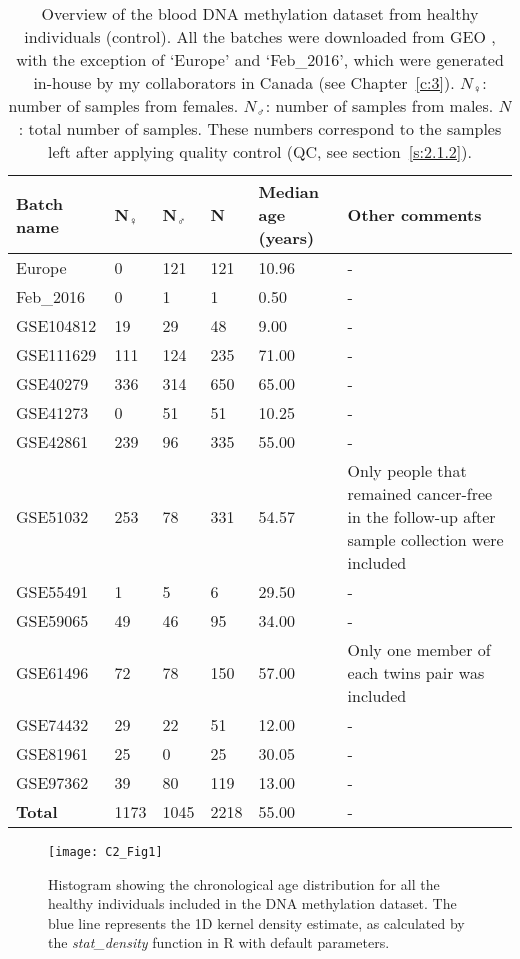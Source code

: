 \begin{table}
\small
	\begin{tabular}{ p{2cm} p{1cm} p{1cm} p{1cm} p{2cm} p{6cm} }
		\toprule
		\textbf{Batch name} & \textbf{N$_{\female}$} & \textbf{N$_{\male}$} & \textbf{N} & \textbf{Median age (years)} & \textbf{Other comments} \\
		\midrule
		Europe & 0 & 121 & 121 & 10.96 & - \\
		Feb\_2016 & 0 & 1 & 1 & 0.50 & - \\
		GSE104812 & 19 & 29 & 48 & 9.00 & - \\
		GSE111629 & 111 & 124 & 235 &  71.00 & - \\
		GSE40279 & 336 & 314 & 650 & 65.00 & - \\
		GSE41273 & 0 & 51 & 51 & 10.25 & - \\
		GSE42861 & 239 & 96 & 335 & 55.00 & - \\
		GSE51032 & 253 & 78 & 331 & 54.57 & Only people that remained cancer-free in the follow-up after sample collection were included  \\
		GSE55491 & 1 & 5 & 6 & 29.50 & - \\
		GSE59065 & 49 & 46 & 95 & 34.00 & - \\
		GSE61496 & 72 & 78 & 150 & 57.00 & Only one member of each twins pair was included \\
		GSE74432 & 29 & 22 & 51 & 12.00 & - \\
		GSE81961 & 25 & 0 & 25 & 30.05 & - \\
		GSE97362 & 39 & 80 & 119 & 13.00 & - \\
		\midrule
		\textbf{Total} & 1173 & 1045 & 2218 & 55.00 & - \\ 
		\bottomrule
	\end{tabular}
	\vspace*{3mm}
	\caption[Overview of the blood DNA methylation dataset from healthy individuals]{Overview of the blood DNA methylation dataset from healthy individuals (control). All the batches were downloaded from GEO \citep{Edgar2002}, with the exception of `Europe' and `Feb\_2016', which were generated in-house by my collaborators in Canada (see Chapter~\ref{c:3}). $N_{\female}$: number of samples from females. $N_{\male}$: number of samples from males. $N$: total number of samples. These numbers correspond to the samples left after applying quality control (QC, see section~\ref{s:2.1.2}).}
	\label{table:c2_table1}
\end{table} 


\begin{figure}[htbp!] 
	\centering    
	\texttt{[image: C2\_Fig1]}
	\vspace*{2mm}
	\caption[Chronological age distribution in the healthy individuals]{Histogram showing the chronological age distribution for all the healthy individuals included in the DNA methylation dataset. The blue line represents the 1D kernel density estimate, as calculated by the \textit{stat\_density} function in R with default parameters.}
	\label{fig:c2_fig1}
\end{figure}

